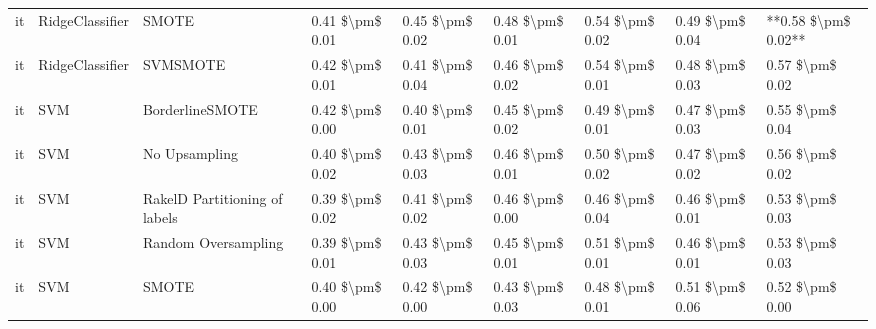 \begin{tabular}{lllllllll}
      it &                 RidgeClassifier &                         SMOTE & 0.41 \$\textbackslash pm\$ 0.01 &           0.45 \$\textbackslash pm\$ 0.02 &       0.48 \$\textbackslash pm\$ 0.01 &        0.54 \$\textbackslash pm\$ 0.02 &                         0.49 \$\textbackslash pm\$ 0.04 & **0.58 \$\textbackslash pm\$ 0.02** \\
      it &                 RidgeClassifier &                      SVMSMOTE & 0.42 \$\textbackslash pm\$ 0.01 &           0.41 \$\textbackslash pm\$ 0.04 &       0.46 \$\textbackslash pm\$ 0.02 &        0.54 \$\textbackslash pm\$ 0.01 &                         0.48 \$\textbackslash pm\$ 0.03 &     0.57 \$\textbackslash pm\$ 0.02 \\
      it &                             SVM &               BorderlineSMOTE & 0.42 \$\textbackslash pm\$ 0.00 &           0.40 \$\textbackslash pm\$ 0.01 &       0.45 \$\textbackslash pm\$ 0.02 &        0.49 \$\textbackslash pm\$ 0.01 &                         0.47 \$\textbackslash pm\$ 0.03 &     0.55 \$\textbackslash pm\$ 0.04 \\
      it &                             SVM &                 No Upsampling & 0.40 \$\textbackslash pm\$ 0.02 &           0.43 \$\textbackslash pm\$ 0.03 &       0.46 \$\textbackslash pm\$ 0.01 &        0.50 \$\textbackslash pm\$ 0.02 &                         0.47 \$\textbackslash pm\$ 0.02 &     0.56 \$\textbackslash pm\$ 0.02 \\
      it &                             SVM & RakelD Partitioning of labels & 0.39 \$\textbackslash pm\$ 0.02 &           0.41 \$\textbackslash pm\$ 0.02 &       0.46 \$\textbackslash pm\$ 0.00 &        0.46 \$\textbackslash pm\$ 0.04 &                         0.46 \$\textbackslash pm\$ 0.01 &     0.53 \$\textbackslash pm\$ 0.03 \\
      it &                             SVM &           Random Oversampling & 0.39 \$\textbackslash pm\$ 0.01 &           0.43 \$\textbackslash pm\$ 0.03 &       0.45 \$\textbackslash pm\$ 0.01 &        0.51 \$\textbackslash pm\$ 0.01 &                         0.46 \$\textbackslash pm\$ 0.01 &     0.53 \$\textbackslash pm\$ 0.03 \\
      it &                             SVM &                         SMOTE & 0.40 \$\textbackslash pm\$ 0.00 &           0.42 \$\textbackslash pm\$ 0.00 &       0.43 \$\textbackslash pm\$ 0.03 &        0.48 \$\textbackslash pm\$ 0.01 &                         0.51 \$\textbackslash pm\$ 0.06 &     0.52 \$\textbackslash pm\$ 0.00 \\

\end{tabular}
